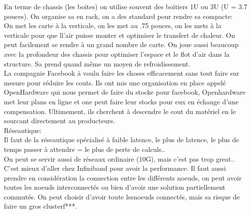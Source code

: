 \documentclass[oneside]{book}
\begin{document}
En terme de chassis (les boites) on utilise souvent des boitiers 1U ou 3U (U = 3.7 pouces). On organise sa en rack, on a des standard pour rendre sa compacte:\\

On met les carte à la verticale, on les met au .75 pouces, on les mets à la verticale pour que ll'air puisse monter et optimiser le transfert de chaleur. On peut facilement se rendre à un grand nombre de carte. On joue aussi beaucoup avec la profondeur des chassis pour optimiser l'espace et le flot d'air dans la structure. Sa prend quand même un moyen de refroidissement.\\

La compagnie Facebook à voulu faire les choses efficacement sans tout faire sur mesure pour réduire les couts. Ils ont mis une organisation en place appelé OpenHardware qui nous permet de faire du stocke pour facebook, Openhardware met leur plans en ligne et one peut faire leur stocks pour eux en échange d'une compensation. Ultimement, ils cherchent à descendre le cout du matériel en le sourcant directement au producteurs.\\

Réseautique:\\

Il faut de la réseautique spécialisé à faible latence, le plus de latence, le plus de temps passer à attendre = le plus de perte de calculs..\\

On peut se servir aussi de réseaux ordinaire (10G), mais c'est pas trop great.. C'est mieux d'aller chez Infiniband pour avoir la performance. Il faut aussi prendre en considération la connection entre les différents noeuds, on peut avoir toutes les noeuds interconnectés ou bien d'avoir une solution partiellement commutés. On peut choisir d'avoir toute lesnoeuds connectés, mais sa risque de faire un gros clusterf***.\\
\end{document}
